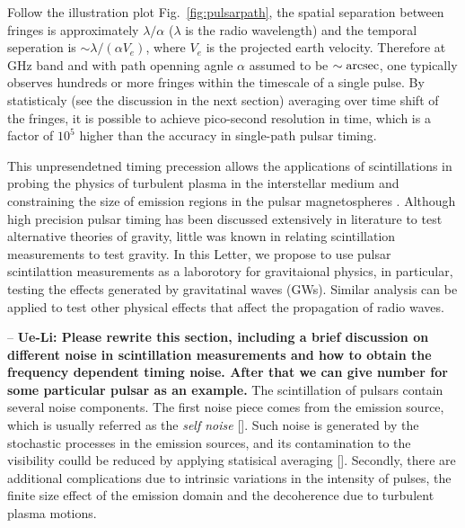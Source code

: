 \documentclass[prl,aps,floatfix,superscriptaddress,twocolumn]{revtex4}
\begin{document}
Follow the illustration plot Fig.~\ref{fig:pulsarpath}, the spatial separation between fringes is approximately $\lambda/\alpha$ ($\lambda$ is the radio wavelength) and the temporal seperation is $\sim \lambda/(\alpha V_e)$, where $V_e$ is the projected earth velocity. Therefore at GHz band and with path openning agnle $\alpha$ assumed to be $\sim {\rm arcsec}$, one typically observes hundreds or more fringes within the timescale of a single pulse. By statisticaly (see the discussion in the next section) averaging over time shift of the fringes, it is possible to achieve pico-second resolution in time, which is a factor of $10^5$ higher than the accuracy in single-path pulsar timing.


This unpresendetned timing precession allows the applications of scintillations in probing the physics of turbulent plasma in the interstellar medium \cite{Rickett1977, Rickett1986}  and constraining the size of emission regions in the pulsar magnetospheres \cite{Johnson2012}. Although high precision pulsar timing has been discussed extensively in literature to test alternative theories of gravity, little was known in relating scintillation measurements to test gravity.  In this Letter, we propose to use pulsar scintilattion measurements as a laborotory for gravitaional physics, in particular, testing the effects generated by gravitatinal waves (GWs). Similar analysis can be applied to test other physical  effects that affect the propagation of radio waves.

\vspace{0.2cm}

 -- {\bf Ue-Li: Please rewrite this section, including a brief discussion on different noise in scintillation measurements and how to obtain the frequency dependent timing noise. After that we can give number for some particular pulsar as an example.} The scintillation of pulsars contain several noise components. The first noise piece comes from the emission source, which is usually referred as the {\it self noise} []. Such noise is generated by the stochastic processes in the emission sources, and its contamination to the visibility coulld be reduced by applying statisical averaging []. Secondly, there are additional complications due to intrinsic variations in the intensity of pulses, the finite size effect of the emission domain and the decoherence due to turbulent plasma motions.
\end{document}
